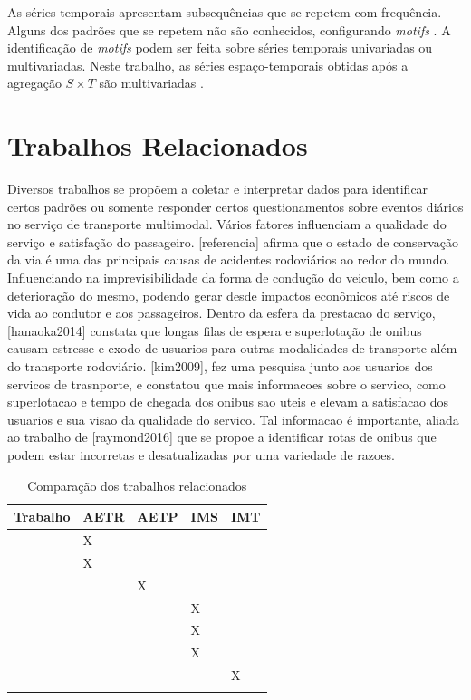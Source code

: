 \documentclass[12pt]{report} %
\begin{document}
As séries temporais apresentam subsequências que se repetem com frequência. Alguns dos padrões que se repetem não são conhecidos, configurando \emph{motifs} \citep{esling2012time}. A identificação de \emph{motifs} podem ser feita sobre séries temporais univariadas ou multivariadas. Neste trabalho, as séries espaço-temporais obtidas após a agregação \emph{$S \times T$} são multivariadas \citep{wang2016effective} \citep{vahdatpour2009toward}. 


\chapter{Trabalhos Relacionados}
\label{sec:trabalhos_relacionados}
Diversos trabalhos se propõem a coletar e interpretar dados para identificar certos padrões ou somente responder certos questionamentos sobre eventos diários no serviço de transporte multimodal. Vários fatores influenciam a qualidade do serviço e satisfação do passageiro.  [referencia] afirma que o estado de conservação da via é uma das principais causas de acidentes rodoviários ao redor do mundo. Influenciando na imprevisibilidade da forma de condução do veiculo, bem como a deterioração do mesmo, podendo gerar desde impactos econômicos até riscos de vida ao condutor e aos passageiros. Dentro da esfera da prestacao do serviço, [hanaoka2014] constata que longas filas de espera e superlotação de onibus causam estresse e exodo de usuarios para outras modalidades de transporte além do transporte rodoviário. [kim2009], fez uma pesquisa junto aos usuarios dos servicos de trasnporte, e constatou que mais informacoes sobre o servico, como superlotacao e tempo de chegada dos onibus sao uteis e elevam a satisfacao dos usuarios e sua visao da qualidade do servico. Tal informacao é importante, aliada ao trabalho de [raymond2016] que se propoe a identificar rotas de onibus que podem estar incorretas e desatualizadas por uma variedade de razoes.


\begin{table}[!ht]
	\centering
	\caption{Comparação dos trabalhos relacionados}
	\begin{tabular}{ L{6cm} C{1.5cm} C{1.5cm} C{1.5cm} C{1.5cm} }
		\hline\noalign{\smallskip}
		Trabalho & AETR  & AETP & IMS  & IMT \\
		\hline\noalign{\smallskip}
		\citet{ferreira2013visual} & X &  &  & \\
		\citet{andrienko2008spatio} & X &  &  & \\
		\citet{adrienko2011spatial} &  & X &  & \\
		\citet{cassisi2013motif} &  &  & X & \\
		\citet{jiang2008finding} &  &  & X & \\
		\citet{chi2012face} &  &  & X & \\
		\citet{schneider2013unravelling} &  &  &  & X \\
		\hline\noalign{\smallskip}
	\end{tabular}
	\label{tbl:sumario}
\end{table}
\end{document}
